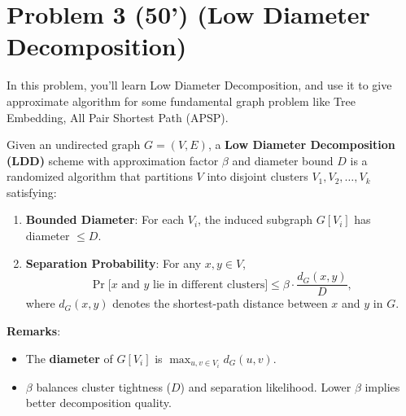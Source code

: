 \section*{Problem 3 (50') (Low Diameter Decomposition)} 
In this problem, you'll learn Low Diameter Decomposition, and use it to give approximate algorithm for some fundamental graph problem like Tree Embedding, All Pair Shortest Path (APSP).


\begin{definition}
    Given an undirected graph $G = (V, E)$, a \textbf{Low Diameter Decomposition (LDD)} scheme with approximation factor $\beta$ and diameter bound $D$ is a randomized algorithm that partitions $V$ into disjoint clusters $V_1, V_2, \dots, V_k$ satisfying:
    \begin{enumerate}
        \item \textbf{Bounded Diameter}: For each $V_i$, the induced subgraph $G[V_i]$ has diameter $\leq D$.
        \item \textbf{Separation Probability}: For any $x, y \in V$,
        $$
            \Pr\big[\text{$x$ and $y$ lie in different clusters}\big] \leq \beta \cdot \frac{d_G(x, y)}{D},
        $$
        where $d_G(x, y)$ denotes the shortest-path distance between $x$ and $y$ in $G$.
    \end{enumerate}
\end{definition}

\noindent \textbf{Remarks}:
\begin{itemize}
    \item The \textbf{diameter} of $G[V_i]$ is $\max_{u,v \in V_i} d_{G}(u, v)$.
    \item $\beta$ balances cluster tightness ($D$) and separation likelihood. Lower $\beta$ implies better decomposition quality.
\end{itemize}

